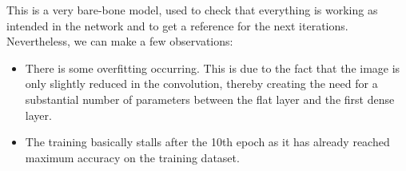 This is a very bare-bone model, used to check that everything is working as intended in the network and to get a reference for the next iterations. Nevertheless, we can make a few observations:
\begin{itemize}
\item There is some overfitting occurring. This is due to the fact that the image is only slightly reduced in the convolution, thereby creating the need for a substantial number of parameters between the flat layer and the first dense layer.
\item The training basically stalls after the 10th epoch as it has already reached maximum accuracy on the training dataset.
\end{itemize}

